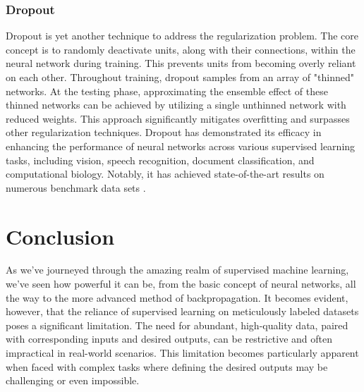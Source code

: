 \documentclass{article}
\begin{document}
\subsubsection{Dropout}%
  \label{sub:Dropout}
  Dropout is yet another technique to address the regularization problem. The core concept is to randomly deactivate units, along with their connections, within the neural network during training. This prevents units from becoming overly reliant on each other. Throughout training, dropout samples from an array of "thinned" networks. At the testing phase, approximating the ensemble effect of these thinned networks can be achieved by utilizing a single unthinned network with reduced weights. This approach significantly mitigates overfitting and surpasses other regularization techniques. Dropout has demonstrated its efficacy in enhancing the performance of neural networks across various supervised learning tasks, including vision, speech recognition, document classification, and computational biology. Notably, it has achieved state-of-the-art results on numerous benchmark data sets \citep{JMLR:v15:srivastava14a}.
    \section{Conclusion}%
    \label{sec:Conclusion}
  As we've journeyed through the amazing realm of supervised machine learning, we've seen how powerful it can be, from the basic concept of neural networks, all the way to the more advanced method of backpropagation. It becomes evident, however, that the reliance of supervised learning on meticulously labeled datasets poses a significant limitation. The need for abundant, high-quality data, paired with corresponding inputs and desired outputs, can be restrictive and often impractical in real-world scenarios. This limitation becomes particularly apparent when faced with complex tasks where defining the desired outputs may be challenging or even impossible. 


{\footnotesize
  
}
% 



%
%
%
\end{document}
